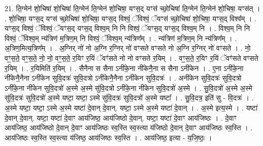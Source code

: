 \documentclass[17pt]{extarticle}
\begin{document}
21. ति॒ग्मेन॑ शो॒चिषा॑ शो॒चिषा॑ ति॒ग्मेन॑ ति॒ग्मेन॑ शो॒चिषा॒ यꣳस॒द् यꣳस॑ च्छो॒चिषा॑ ति॒ग्मेन॑ ति॒ग्मेन॑ शो॒चिषा॒ यꣳस॑त् । . शो॒चिषा॒ यꣳस॒द् यꣳस॑ च्छो॒चिषा॑ शो॒चिषा॒ यꣳस॒द् विश्वं॒ ॅविश्वं॒ ॅयꣳस॑ च्छो॒चिषा॑ शो॒चिषा॒ यꣳस॒द् विश्व᳚म् । . यꣳस॒द् विश्वं॒ ॅविश्वं॒ ॅयꣳस॒द् यꣳस॒द् विश्व॒म् नि नि विश्वं॒ ॅयꣳस॒द् यꣳस॒द् विश्व॒म् नि । . विश्व॒म् नि नि विश्वं॒ ॅविश्व॒म् न्य॑त्रिण॑ म॒त्रिण॒म् नि विश्वं॒ ॅविश्व॒म् न्य॑त्रिण᳚म् । . न्य॑त्रिण॑ म॒त्रिण॒म् नि न्य॑त्रिण᳚म् । . अ॒त्रिण॒मित्य॒त्रिण᳚म् । . अ॒ग्निर् नो॑ नो अ॒ग्नि र॒ग्निर् नो॑ वꣳसते वꣳसते नो अ॒ग्नि र॒ग्निर् नो॑ वꣳसते । . नो॒ वꣳ॒॒स॒ते॒ वꣳ॒॒स॒ते॒ नो॒ नो॒ वꣳ॒॒स॒ते॒ र॒यिꣳ र॒यिं ॅवꣳ॑सते नो नो वꣳसते र॒यिम् । . वꣳ॒॒स॒ते॒ र॒यिꣳ र॒यिं ॅवꣳ॑सते वꣳसते र॒यिम् । . र॒यिमिति॑ र॒यिम् । . सैनैना स सैना ऽनी॑के॒ना नी॑केनै॒ना स सैना ऽनी॑केन । . ए॒ना ऽनी॑के॒ना नी॑केनै॒नैना ऽनी॑केन सुवि॒दत्रः॑ सुवि॒दत्रो ऽनी॑केनै॒नैना ऽनी॑केन सुवि॒दत्रः॑ । . अनी॑केन सुवि॒दत्रः॑ सुवि॒दत्रो ऽनी॑के॒ना नी॑केन सुवि॒दत्रो॑ अ॒स्मे अ॒स्मे सु॑वि॒दत्रो ऽनी॑के॒ना नी॑केन सुवि॒दत्रो॑ अ॒स्मे । . सु॒वि॒दत्रो॑ अ॒स्मे अ॒स्मे सु॑वि॒दत्रः॑ सुवि॒दत्रो॑ अ॒स्मे यष्टा॒ यष्टा॒ ऽस्मे सु॑वि॒दत्रः॑ सुवि॒दत्रो॑ अ॒स्मे यष्टा᳚ । . सु॒वि॒दत्र॒ इति॑ सु - वि॒दत्रः॑ । . अ॒स्मे यष्टा॒ यष्टा॒ ऽस्मे अ॒स्मे यष्टा॑ दे॒वान् दे॒वान्. यष्टा॒ ऽस्मे अ॒स्मे यष्टा॑ दे॒वान् । . अ॒स्मे इत्य॒स्मे । . यष्टा॑ दे॒वान् दे॒वान्. यष्टा॒ यष्टा॑ दे॒वाꣳ आय॑जिष्ठ॒ आय॑जिष्ठो दे॒वान्. यष्टा॒ यष्टा॑ दे॒वाꣳ आय॑जिष्ठः । . दे॒वाꣳ आय॑जिष्ठ॒ आय॑जिष्ठो दे॒वान् दे॒वाꣳ आय॑जिष्ठः स्व॒स्ति स्व॒स्त्या य॑जिष्ठो दे॒वान् दे॒वाꣳ आय॑जिष्ठः स्व॒स्ति । . आय॑जिष्ठः स्व॒स्ति स्व॒स्त्या य॑जिष्ठ॒ आय॑जिष्ठः स्व॒स्ति । . आय॑जिष्ठ॒ इत्या - य॒जि॒ष्ठः॒ । \newline
\end{document}
